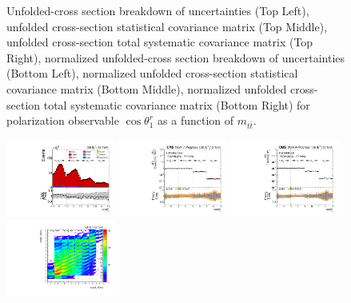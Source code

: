 \begin{refsection}
\begin{figure}[htb]
\begin{center}
\caption{Unfolded-cross section breakdown of uncertainties (Top Left), unfolded cross-section statistical covariance matrix (Top Middle), unfolded cross-section total systematic covariance matrix (Top Right), normalized unfolded-cross section breakdown of uncertainties (Bottom Left), normalized unfolded cross-section statistical covariance matrix (Bottom Middle), normalized unfolded cross-section total systematic covariance matrix (Bottom Right) for polarization observable $\cos\theta_{1}^{r}$ as a function of $m_{t\bar{t}}$.}
\label{fig:b1r_mttbar_uncertainties}
\end{center}
\end{figure}
\clearpage
\begin{figure}[htb]
\begin{center}
 \includegraphics[width=0.32\textwidth]{fig_fullRun2UL/controlplots/combined/Hyp_LeptonBr_vs_TTBarMass.pdf}
 \includegraphics[width=0.32\textwidth]{fig_fullRun2UL/unfolding/combined/UnfoldedResults_b2r_mttbar.pdf}
 \includegraphics[width=0.32\textwidth]{fig_fullRun2UL/unfolding/combined/UnfoldedResultsNorm_b2r_mttbar.pdf} \\
 \includegraphics[width=0.32\textwidth]{fig_fullRun2UL/unfolding/combined/ResponseMatrix_b2r_mttbar.pdf}

\end{center}
\end{figure}
\end{refsection}
